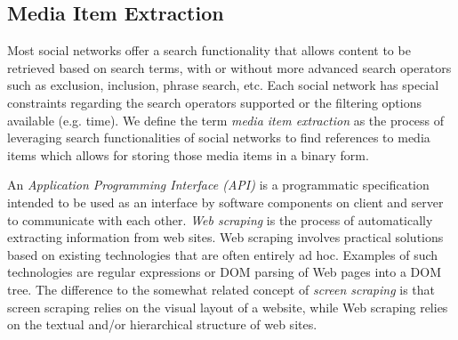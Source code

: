 \subsection{Media Item Extraction}
Most social networks offer a search functionality that allows content to be retrieved based on search terms, with or without more advanced
search operators such as exclusion, inclusion, phrase search, etc. Each social network has special constraints regarding the search operators
supported or the filtering options available (e.g. time). We define the term \emph{media item extraction} as the process of leveraging
search functionalities of social networks to find references to media items which allows for storing those media items in a binary form.

An \emph{Application Programming Interface (API)} is a programmatic specification intended to be used as an interface by software components on client and server to communicate with each other. \emph{Web scraping} is the process of automatically extracting information from web sites. Web scraping involves practical solutions based on existing technologies that are often entirely ad hoc. Examples of such technologies are regular expressions or DOM parsing of Web pages into a DOM tree. The difference to the somewhat related concept of \emph{screen scraping} is that screen scraping relies on the visual layout of a website, while Web scraping relies on the textual and/or hierarchical structure of web sites.

